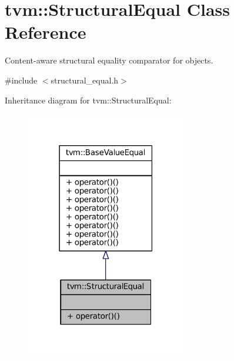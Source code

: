 \hypertarget{classtvm_1_1StructuralEqual}{}\section{tvm\+:\+:Structural\+Equal Class Reference}
\label{classtvm_1_1StructuralEqual}


Content-\/aware structural equality comparator for objects.  




{\ttfamily \#include $<$structural\+\_\+equal.\+h$>$}



Inheritance diagram for tvm\+:\+:Structural\+Equal\+:
\nopagebreak
\begin{figure}[H]
\begin{center}
\leavevmode
\includegraphics[width=198pt]{classtvm_1_1StructuralEqual__inherit__graph}
\end{center}
\end{figure}


